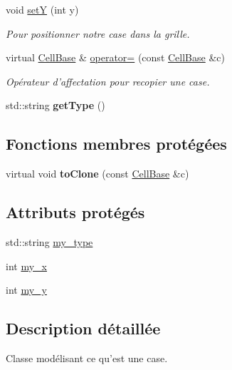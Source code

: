\begin{DoxyCompactItemize}
void \hyperlink{class_cell_base_a5c2f67f6bb1ba06b42c90d81b5ed872a}{set\-Y} (int y)
\begin{DoxyCompactList}\small\item\em Pour positionner notre case dans la grille. \end{DoxyCompactList}\item 
virtual \hyperlink{class_cell_base}{Cell\-Base} \& \hyperlink{class_cell_base_a31f5f4bcdc5e254476b376eadc8fa2f6}{operator=} (const \hyperlink{class_cell_base}{Cell\-Base} \&c)
\begin{DoxyCompactList}\small\item\em Opérateur d'affectation pour recopier une case. \end{DoxyCompactList}\item 
\hypertarget{class_cell_base_aae6d1d9ee7ad46d21c4ac6e698cd2754}{std\-::string {\bfseries get\-Type} ()}\label{class_cell_base_aae6d1d9ee7ad46d21c4ac6e698cd2754}

\end{DoxyCompactItemize}
\subsection*{Fonctions membres protégées}
\begin{DoxyCompactItemize}
\item 
\hypertarget{class_cell_base_a1f9036ed8d703f7b341b49eec4fd8882}{virtual void {\bfseries to\-Clone} (const \hyperlink{class_cell_base}{Cell\-Base} \&c)}\label{class_cell_base_a1f9036ed8d703f7b341b49eec4fd8882}

\end{DoxyCompactItemize}
\subsection*{Attributs protégés}
\begin{DoxyCompactItemize}
\item 
std\-::string \hyperlink{class_cell_base_a4039c6141e348f927d90297d01e19509}{my\-\_\-type}
\item 
int \hyperlink{class_cell_base_a9dc2714aa92817ba6a6a23da19eb4fde}{my\-\_\-x}
\item 
int \hyperlink{class_cell_base_a39722b0f229e34f50c7b9d4d12d19a52}{my\-\_\-y}
\end{DoxyCompactItemize}


\subsection{Description détaillée}
Classe modélisant ce qu'est une case. 

